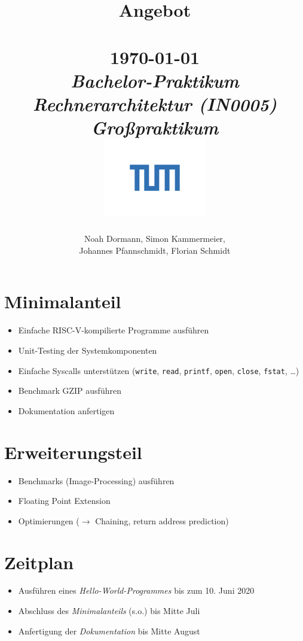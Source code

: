 \documentclass{article}
\title{
    \vspace{2in}
    \textmd{\textbf{Angebot\\\titleOfDocument}}\\
    \normalsize\vspace{0.1in}\small{\today}\\
    \vspace{0.1in}\large{\textit{Bachelor-Praktikum Rechnerarchitektur (IN0005)\\Großpraktikum}}
    \vspace{2in}
    \centering\\
    \includegraphics[width=4.5cm]{images/tum}
}
\author{Noah Dormann, Simon Kammermeier,\\Johannes Pfannschmidt, Florian Schmidt}
\date{}
\newcommand{\refer}[0]{$\rightarrow$ }
\begin{document}
\maketitle
\thispagestyle{empty}
\pagebreak

\section*{Minimalanteil}
\begin{itemize}
	\item Einfache RISC-V-kompilierte Programme ausführen
	\item Unit-Testing der Systemkomponenten
	\item Einfache Syscalls unterstützen (\verb!write!, \verb!read!, \verb!printf!, \verb!open!, \verb!close!, \verb!fstat!, \ldots)
	\item Benchmark GZIP ausführen
	\item Dokumentation anfertigen
\end{itemize}

\section*{Erweiterungsteil}
\begin{itemize}
	\item Benchmarks (Image-Processing) ausführen
	\item Floating Point Extension
	\item Optimierungen (\refer Chaining, return address prediction)
\end{itemize}

\section*{Zeitplan}
\begin{itemize}
	\item Ausführen eines \emph{Hello-World-Programmes} bis zum 10. Juni 2020
	\item Abschluss des \emph{Minimalanteils} (s.o.) bis Mitte Juli
	\item Anfertigung der \emph{Dokumentation} bis Mitte August
\end{itemize}
\end{document}
